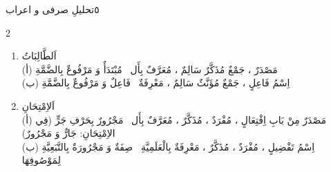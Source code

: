 \begin{JTamrin}{٥}{تحلیلِ صرفی و اعراب}
\begin{multicols}{2}
\begin{enumerate}
        مَعْلُومٌ ، لَازِمٌ
  \item اَلطَّالِبَاتُ\\
        (أ) مَصْدَرٌ ، جَمْعٌ مُذَكَّرٌ سَالِمٌ ، مُعَرَّفٌ بِأَل \textbar\
        مُبْتَدَأٌ وَ مَرْفُوعٌ بِالضَّمَّةِ\\
        (ب) اِسْمُ فَاعِلٍ ، جَمْعٌ مُؤَنَّثٌ سَالِمٌ ، مَعْرِفَةٌ \textbar\
        فَاعِلٌ وَ مَرْفُوعٌ بِالضَّمَّةِ
  \item اَلاِمْتِحَانِ\\
        (أ) مَصْدَرٌ مِنْ بَابِ اِفْتِعَالٍ ، مُفْرَدٌ ، مُذَكَّرٌ ، مُعَرَّفٌ
        بِأَل \textbar\ مَجْرُورٌ بِحَرْفِ جَرٍّ (فِي الاِمْتِحَانِ: جَارٌّ
        وَ مَجْرُورٌ)\\
        (ب) اِسْمُ تَفْضِيلٍ ، مُفْرَدٌ ، مُذَكَّرٌ ، مَعْرِفَةٌ بِالْعَلَمِيَّةِ
        \textbar\ صِفَةٌ وَ مَجْرُورَةٌ بِالتَّبَعِيَّةِ لِمَوْصُوفِهَا
\end{enumerate}
\end{multicols}
\end{JTamrin}

